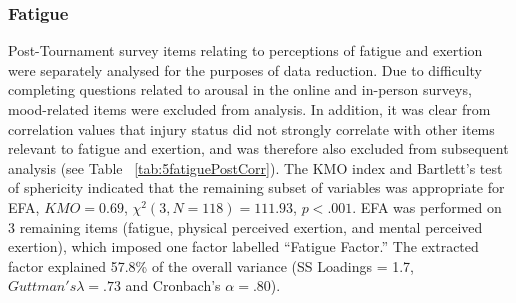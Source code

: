 \begin{CJK}{UTF8}{gbsn}







%    
%    

%    
%    
%    







\subsubsection{Fatigue \label{app8:fatigueEFA}}

Post-Tournament survey items relating to perceptions of fatigue and exertion were separately analysed for the purposes of data reduction.  Due to difficulty completing questions related to arousal in the online and in-person surveys, mood-related items were excluded from analysis.  In addition, it was clear from correlation values that injury status did not strongly correlate with other items relevant to fatigue and exertion, and was therefore also excluded from subsequent analysis (see Table ~\ref{tab:5fatiguePostCorr}).  The KMO index and Bartlett's test of sphericity indicated that the remaining subset of variables was appropriate for EFA, $KMO =  0.69$, $\chi^2(3, N = 118) = 111.93$, $p < .001$. EFA was performed on 3 remaining items (fatigue, physical perceived exertion, and mental perceived exertion), which imposed one factor labelled ``Fatigue Factor.''  The extracted factor explained 57.8\% of the overall variance (SS Loadings = 1.7, $Guttman's\lambda =.73$ and Cronbach's $\alpha = .80$).


\end{CJK}
